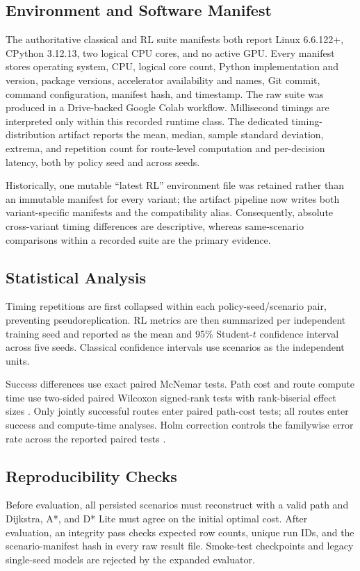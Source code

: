 \subsection{Environment and Software Manifest}

The authoritative classical and RL suite manifests both report Linux
6.6.122+, CPython 3.12.13, two logical CPU cores, and no active GPU. Every
manifest stores operating system, CPU, logical core count, Python
implementation and version, package versions, accelerator availability and
names, Git commit, command configuration, manifest hash, and timestamp. The raw
suite was produced in a Drive-backed Google Colab workflow. Millisecond
timings are interpreted only within this recorded runtime class.
The dedicated timing-distribution artifact reports the mean, median, sample
standard deviation, extrema, and repetition count for route-level computation
and per-decision latency, both by policy seed and across seeds.

Historically, one mutable ``latest RL'' environment file was retained rather
than an immutable manifest for every variant; the artifact pipeline now writes
both variant-specific manifests and the compatibility alias. Consequently,
absolute cross-variant timing differences are descriptive, whereas
same-scenario comparisons within a recorded suite are the primary evidence.

\subsection{Statistical Analysis}

Timing repetitions are first collapsed within each policy-seed/scenario pair,
preventing pseudoreplication. RL metrics are then summarized per independent
training seed and reported as the mean and 95\% Student-$t$ confidence
interval across five seeds. Classical confidence intervals use scenarios as
the independent units.

Success differences use exact paired McNemar tests. Path cost and route compute
time use two-sided paired Wilcoxon signed-rank tests with rank-biserial effect
sizes \cite{mcnemar1947note,wilcoxon1945individual}. Only jointly successful
routes enter paired path-cost tests; all routes enter success and compute-time
analyses. Holm correction controls the familywise error rate across the
reported paired tests \cite{holm1979simple}.

\subsection{Reproducibility Checks}

Before evaluation, all persisted scenarios must reconstruct with a valid path
and Dijkstra, A*, and D* Lite must agree on the initial optimal cost. After
evaluation, an integrity pass checks expected row counts, unique run IDs, and
the scenario-manifest hash in every raw result file. Smoke-test checkpoints and
legacy single-seed models are rejected by the expanded evaluator.

